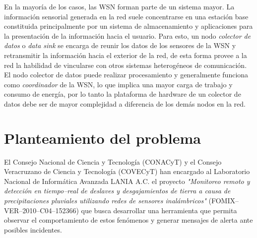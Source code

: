 
En la mayoría de los casos, las WSN forman parte de un sistema mayor. La información sensorial generada en la red suele concentrarse en una estación base constituida principalmente por un sistema de almacenamiento y aplicaciones para la presentación de la información hacia el usuario. Para esto, un nodo \textit{colector de datos} o \textit{data sink} se encarga de reunir los datos de los sensores de la WSN y retransmitir la información hacia el exterior de la red, de esta forma provee a la red la habilidad de vincularse con otros sistemas heterogéneos de comunicación. El nodo colector de datos puede realizar procesamiento y generalmente funciona como \textit{coordinador} de la WSN, lo que implica una mayor carga de trabajo y consumo de energía, por lo tanto la plataforma de hardware de un colector de datos debe ser de mayor complejidad a diferencia de los demás nodos en la red. 


\section{Planteamiento del problema}


El Consejo Nacional de Ciencia y Tecnología (CONACyT) y el Consejo Veracruzano de Ciencia y Tecnología (COVECyT) han encargado al Laboratorio Nacional de Informática Avanzada LANIA A.C. el proyecto \textit{"Monitoreo remoto y detección en tiempo--real de deslaves y desgajamientos de tierra a causa de precipitaciones pluviales utilizando redes de sensores inalámbricos"} (FOMIX--VER--2010--C04--152366) que busca desarrollar una herramienta que permita observar el comportamiento de estos fenómenos y generar mensajes de alerta ante posibles incidentes. 

